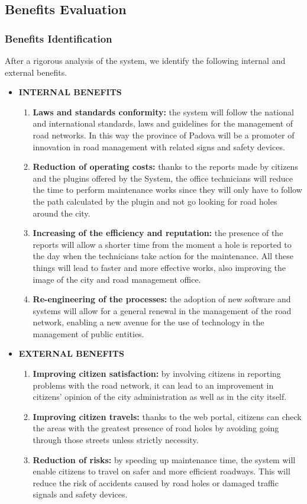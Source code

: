 \newpage

\subsection{Benefits Evaluation}
\subsubsection{Benefits Identification}
After a rigorous analysis of the system, we identify the following internal and external benefits.
\begin{itemize}
    \item \textbf{INTERNAL BENEFITS}
    \begin{enumerate}
        \item \textbf{Laws and standards conformity:} the system will follow the national and international standards, laws and guidelines for the management of road networks. In this way the province of Padova will be a promoter of innovation in road management with related signs and safety devices.
        \item \textbf{Reduction of operating costs:} thanks to the reports made by citizens and the plugins offered by the System, the office technicians will reduce the time to perform maintenance works since they will only have to follow the path calculated by the plugin and not go looking for road holes around the city.
        \item \textbf{Increasing of the efficiency and reputation:} the presence of the reports will allow a shorter time from the moment a hole is reported to the day when the technicians take action for the maintenance. All these things will lead to faster and more effective works, also improving the image of the city and road management office.
        \item \textbf{Re-engineering of the processes:} the adoption of new software and systems will allow for a general renewal in the management of the road network, enabling a new avenue for the use of technology in the management of public entities.
    \end{enumerate}
    \item \textbf{EXTERNAL BENEFITS}
    \begin{enumerate}
        \item \textbf{Improving citizen satisfaction:} by involving citizens in reporting problems with the road network, it can lead to an improvement in citizens' opinion of the city administration as well as in the city itself.
        \item \textbf{Improving citizen travels:} thanks to the web portal, citizens can check the areas with the greatest presence of road holes by avoiding going through those streets unless strictly necessity.
        \item \textbf{Reduction of risks:} by speeding up maintenance time, the system will enable citizens to travel on safer and more efficient roadways. This will reduce the risk of accidents caused by road holes or damaged traffic signals and safety devices.
    \end{enumerate}
\end{itemize}

